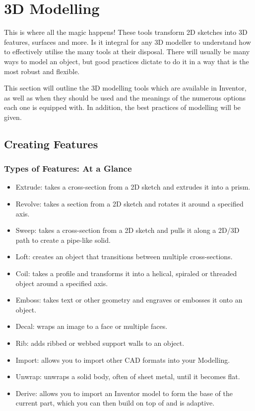 \chapter{3D Modelling}

This is where all the magic happens! These tools transform 2D sketches into 3D features, surfaces and more. Is it integral for any 3D modeller to understand how to effectively utilise the many tools at their disposal. There will usually be many ways to model an object, but good practices dictate to do it in a way that is the most robust and flexible.

This section will outline the 3D modelling tools which are available in Inventor, as well as when they should be used and the meanings of the numerous options each one is equipped with. In addition, the best practices of modelling will be given.

\section{Creating Features}

\subsection{Types of Features: At a Glance}
\begin{itemize}
\item Extrude: takes a cross-section from a 2D sketch and extrudes it into a prism.
\item Revolve: takes a section from a 2D sketch and rotates it around a specified axis.
\item Sweep: takes a cross-section from a 2D sketch and pulls it along a 2D/3D path to create a pipe-like solid.
\item Loft: creates an object that transitions between multiple cross-sections.
\item Coil: takes a profile and transforms it into a helical, spiraled or threaded object around a specified axis.
\item Emboss: takes text or other geometry and engraves or embosses it onto an object.
\item Decal: wraps an image to a face or multiple faces.
\item Rib: adds ribbed or webbed support walls to an object.
\item Import: allows you to import other CAD formats into your Modelling.
\item Unwrap: unwraps a solid body, often of sheet metal, until it becomes flat.
\item Derive: allows you to import an Inventor model to form the base of the current part, which you can then build on top of and is adaptive.
\end{itemize}

